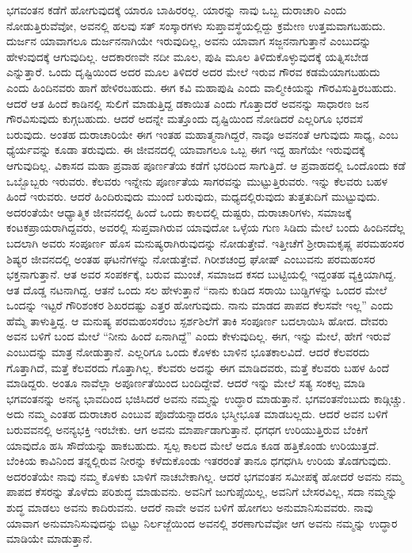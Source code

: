 ಭಗವಂತನ ಕಡೆಗೆ ಹೋಗುವುದಕ್ಕೆ ಯಾರೂ ಬಾಹಿರರಲ್ಲ. ಯಾರನ್ನು ನಾವು ಒಬ್ಬ ದುರಾಚಾರಿ ಎಂದು ನೋಡುತ್ತಿರುವೆವೋ, ಅವನಲ್ಲಿ ಹಲವು ಸತ್ ಸಂಸ್ಕಾರಗಳು ಸುಪ್ತಾವಸ್ಥೆ\-ಯಲ್ಲಿದ್ದು ಕ್ರಮೇಣ ಉತ್ತಮವಾಗಬಹುದು. ದುರ್ಜನ ಯಾವಾಗಲೂ ದುರ್ಜನನಾಗಿಯೇ ಇರುವುದಿಲ್ಲ, ಅವನು ಯಾವಾಗ ಸಜ್ಜನನಾಗುತ್ತಾನೆ ಎಂಬುದನ್ನು ಹೇಳುವುದಕ್ಕೆ ಆಗುವುದಿಲ್ಲ. ಆದಕಾರಣವೇ ನದೀ ಮೂಲ, ಪುಷಿ ಮೂಲ ತಿಳಿದುಕೊಳ್ಳುವುದಕ್ಕೆ ಯತ್ನಿಸಬೇಡ ಎನ್ನುತ್ತಾರೆ. ಒಂದು ದೃಷ್ಟಿಯಿಂದ ಅದರ ಮೂಲ ತಿಳಿದರೆ ಅದರ ಮೇಲೆ ಇರುವ ಗೌರವ ಕಡಮೆಯಾಗಬಹುದು ಎಂದು ಹಿಂದಿನವರು ಹಾಗೆ ಹೇಳಿರಬಹುದು. ಈಗ ಕವಿ ಮಹಾಪುಷಿ ಎಂದು ವಾಲ್ಮೀಕಿಯನ್ನು ಗೌರವಿಸುತ್ತಿರಬಹುದು. ಆದರೆ ಆತ ಹಿಂದೆ ಕಾಡಿನಲ್ಲಿ ಸುಲಿಗೆ ಮಾಡುತ್ತಿದ್ದ ಡಕಾಯಿತ ಎಂದು ಗೊತ್ತಾದರೆ ಅವನನ್ನು ಸಾಧಾರಣ ಜನ ಗೌರವಿಸುವುದು ಕುಗ್ಗಬಹುದು. ಆದರೆ ಅದನ್ನೇ ಮತ್ತೊಂದು ದೃಷ್ಟಿಯಿಂದ ನೋಡಿದರೆ ಎಲ್ಲರಿಗೂ ಭರವಸೆ ಬರುವುದು. ಅಂತಹ ದುರಾಚಾರಿಯೇ ಈಗ ಇಂತಹ ಮಹಾತ್ಮನಾಗಿದ್ದರೆ, ನಾವೂ ಅವನಂತೆ ಆಗುವುದು ಸಾಧ್ಯ, ಎಂಬ ಧ್ಯೆರ್ಯವನ್ನು ಕೂಡಾ ತರುವುದು. ಈ ಜೀವನದಲ್ಲಿ ಯಾವಾಗಲೂ ಒಬ್ಬ ಈಗ ಇದ್ದ ಹಾಗೆಯೇ ಇರುವುದಕ್ಕೆ ಆಗುವುದಿಲ್ಲ. ವಿಕಾಸದ ಮಹಾ ಪ್ರವಾಹ ಪೂರ್ಣತೆಯ ಕಡೆಗೆ ಭರದಿಂದ ಸಾಗುತ್ತಿದೆ. ಆ ಪ್ರವಾಹದಲ್ಲಿ ಒಂದೊಂದು ಕಡೆ ಒಬ್ಬೊಬ್ಬರು ಇರುವರು. ಕೆಲವರು ಇನ್ನೇನು ಪೂರ್ಣತೆಯ ಸಾಗರವನ್ನು ಮುಟ್ಟುತ್ತಿರುವರು. ಇನ್ನು ಕೆಲವರು ಬಹಳ ಹಿಂದೆ ಇರುವರು. ಆದರೆ ಹಿಂದಿರುವುದು ಮುಂದೆ ಬರುವುದು, ಮಧ್ಯದಲ್ಲಿರುವುದು ತುತ್ತತುದಿಗೆ ಮುಟ್ಟುವುದು. ಅದರಂತೆಯೇ ಆಧ್ಯಾತ್ಮಿಕ ಜೀವನದಲ್ಲಿ ಹಿಂದೆ ಒಂದು ಕಾಲದಲ್ಲಿ ದುಷ್ಟರು, ದುರಾಚಾರಿಗಳು, ಸಮಾಜಕ್ಕೆ ಕಂಟಕಪ್ರಾಯರಾಗಿದ್ದವರು, ಅವರಲ್ಲಿ ಸುಪ್ತವಾಗಿರುವ ಯಾವುದೋ ಒಳ್ಳೆಯ ಗುಣ ಸಿಡಿದು ಮೇಲೆ ಬಂದು ಹಿಂದಿನದೆಲ್ಲ ಬದಲಾಗಿ ಅವರು ಸಂಪೂರ್ಣ ಹೊಸ ಮನುಷ್ಯರಾಗಿರುವುದನ್ನು ನೋಡುತ್ತೇವೆ. ಇತ್ತೀಚೆಗೆ ಶ‍್ರೀರಾಮಕೃಷ್ಣ ಪರಮಹಂಸರ ಶಿಷ್ಯರ ಜೀವನದಲ್ಲಿ ಅಂತಹ ಘಟನೆಗಳನ್ನು ನೋಡುತ್ತೇವೆ. ಗಿರೀಶಚಂದ್ರ ಘೋಷ್ ಎಂಬುವನು ಪರಮಹಂಸರ ಭಕ್ತನಾಗುತ್ತಾನೆ. ಆತ ಅವರ ಸಂಪರ್ಕಕ್ಕೆ, ಬರುವ ಮುಂಚೆ, ಸಮಾಜದ ಕಸದ ಬುಟ್ಟಿಯಲ್ಲಿ ಇದ್ದಂತಹ ವ್ಯಕ್ತಿಯಾಗಿದ್ದ. ಆತ ದೊಡ್ಡ ನಟನಾಗಿದ್ದ. ಆತನೆ ಒಂದು ಸಲ ಹೇಳುತ್ತಾನೆ “ನಾನು ಕುಡಿದ ಸರಾಯಿ ಬುಡ್ಡಿಗಳನ್ನು ಒಂದರ ಮೇಲೆ ಒಂದನ್ನು ಇಟ್ಟರೆ ಗೌರಿಶಂಕರ ಶಿಖರದಷ್ಟು ಎತ್ತರ ಹೋಗುವುದು. ನಾನು ಮಾಡದ ಪಾಪದ ಕೆಲಸವೇ ಇಲ್ಲ” ಎಂದು ಹೆಮ್ಮೆ ತಾಳುತ್ತಿದ್ದ. ಆ ಮನುಷ್ಯ ಪರಮಹಂಸರೆಂಬ ಸ್ಪರ್ಶಶಿಲೆಗೆ ತಾಕಿ ಸಂಪೂರ್ಣ ಬದಲಾಯಿಸಿ ಹೋದ. ದೇವರು ಅವನ ಬಳಿಗೆ ಬಂದ ಮೇಲೆ “ನೀನು ಹಿಂದೆ ಏನಾಗಿದ್ದೆ” ಎಂದು ಕೇಳುವುದಿಲ್ಲ. ಈಗ, ಇನ್ನು ಮೇಲೆ, ಹೇಗೆ ಇರುವೆ ಎಂಬುದನ್ನು ಮಾತ್ರ ನೋಡುತ್ತಾನೆ. ಎಲ್ಲರಿಗೂ ಒಂದು ಕೊಳಕು ಬಾಳಿನ ಭೂತಕಾಲವಿದೆ. ಆದರೆ ಕೆಲವರದು ಗೊತ್ತಾಗಿದೆ, ಮತ್ತೆ ಕೆಲವರದು ಗೊತ್ತಾಗಿಲ್ಲ. ಕೆಲವರು ಅದನ್ನು ಈಗ ಮಾಡಿದವರು, ಮತ್ತೆ ಕೆಲವರು ಬಹಳ ಹಿಂದೆ ಮಾಡಿದ್ದರು. ಅಂತೂ ನಾವೆಲ್ಲಾ ಅಪೂರ್ಣತೆಯಿಂದ ಬಂದಿದ್ದೇವೆ. ಆದರೆ ಇನ್ನು ಮೇಲೆ ಸತ್ಯ ಸಂಕಲ್ಪ ಮಾಡಿ ಭಗವಂತನನ್ನು ಅನನ್ಯ ಭಾವದಿಂದ ಭಜಿಸಿದರೆ ಅವನು ನಮ್ಮನ್ನು ಉದ್ಧಾರ ಮಾಡುತ್ತಾನೆ. ಭಗವಂತನೆಂಬುದು ಕಾಡ್ಗಿಚ್ಚು. ಅದು ನಮ್ಮ ಎಂತಹ ದುರಾಚಾರ ಎಂಬುವ ಪೊದೆಯನ್ನಾದರೂ ಭಸ್ಮೀಭೂತ ಮಾಡಬಲ್ಲದು. ಆದರೆ ಅವನ ಬಳಿಗೆ ಬರುವವನಲ್ಲಿ ಅನನ್ಯಭಕ್ತಿ ಇರಬೇಕು. ಆಗ ಅವನು ಮಾರ್ಪಾಡಾಗುತ್ತಾನೆ. ಧಗಧಗ ಉರಿಯುತ್ತಿರುವ ಬೆಂಕಿಗೆ ಯಾವುದೊ ಹಸಿ ಸೌದೆಯನ್ನು ಹಾಕಬಹುದು. ಸ್ವಲ್ಪ ಕಾಲದ ಮೇಲೆ ಅದೂ ಕೂಡ ಹತ್ತಿಕೊಂಡು ಉರಿಯುತ್ತದೆ. ಬೆಂಕಿಯ ಕಾವಿನಿಂದ ತನ್ನಲ್ಲಿರುವ ನೀರನ್ನು ಕಳೆದುಕೊಂಡು ಇತರರಂತೆ ತಾನೂ ಧಗಧಗಿಸಿ ಉರಿಯ ತೊಡಗುವುದು. ಅದರಂತೆಯೇ ನಾವು ನಮ್ಮ ಕೊಳಕು ಬಾಳಿಗೆ ನಾಚಬೇಕಾಗಿಲ್ಲ. ಆದರೆ ಭಗವಂತನ ಸಮೀಪಕ್ಕೆ ಹೋದರೆ ಅವನು ನಮ್ಮ ಪಾಪದ ಕೆಸರನ್ನು ತೊಳೆದು ಪರಿಶುದ್ಧ ಮಾಡುವನು. ಅವನಿಗೆ ಜುಗುಪ್ಸೆಯಿಲ್ಲ, ಅವನಿಗೆ ಬೇಸರವಿಲ್ಲ, ಸದಾ ನಮ್ಮನ್ನು ಶುದ್ಧ ಮಾಡಲು ಅವನು ಕಾದಿರುವನು. ಆದರೆ ನಾವೇ ಅವನ ಬಳಿಗೆ ಹೋಗಲು ಅನುಮಾನಿಸುವವರು. ನಾವು ಯಾವಾಗ ಅನುಮಾನಿಸುವುದನ್ನು ಬಿಟ್ಟು ನಿರ್ಲಜ್ಜೆಯಿಂದ ಅವನಲ್ಲಿ ಶರಣಾಗುವೆವೋ ಆಗ ಅವನು ನಮ್ಮನ್ನು ಉದ್ಧಾರ ಮಾಡಿಯೇ ಮಾಡುತ್ತಾನೆ.


